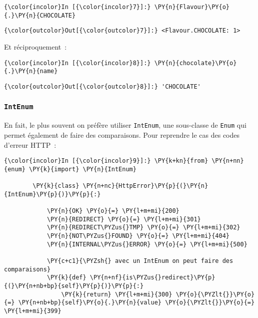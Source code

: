     \begin{Verbatim}[commandchars=\\\{\},frame=single,framerule=0.3mm,rulecolor=\color{cellframecolor}]
{\color{incolor}In [{\color{incolor}7}]:} \PY{n}{Flavour}\PY{o}{.}\PY{n}{CHOCOLATE}
\end{Verbatim}


\begin{Verbatim}[commandchars=\\\{\},frame=single,framerule=0.3mm,rulecolor=\color{cellframecolor}]
{\color{outcolor}Out[{\color{outcolor}7}]:} <Flavour.CHOCOLATE: 1>
\end{Verbatim}
            
    Et réciproquement~:

    \begin{Verbatim}[commandchars=\\\{\},frame=single,framerule=0.3mm,rulecolor=\color{cellframecolor}]
{\color{incolor}In [{\color{incolor}8}]:} \PY{n}{chocolate}\PY{o}{.}\PY{n}{name}
\end{Verbatim}


\begin{Verbatim}[commandchars=\\\{\},frame=single,framerule=0.3mm,rulecolor=\color{cellframecolor}]
{\color{outcolor}Out[{\color{outcolor}8}]:} 'CHOCOLATE'
\end{Verbatim}
            
    \hypertarget{intenum}{%
\subsubsection{\texorpdfstring{\texttt{IntEnum}}{IntEnum}}\label{intenum}}

    En fait, le plus souvent on préfère utiliser \texttt{IntEnum}, une
sous-classe de \texttt{Enum} qui permet également de faire des
comparaisons. Pour reprendre le cas des codes d'erreur HTTP~:

    \begin{Verbatim}[commandchars=\\\{\},frame=single,framerule=0.3mm,rulecolor=\color{cellframecolor}]
{\color{incolor}In [{\color{incolor}9}]:} \PY{k+kn}{from} \PY{n+nn}{enum} \PY{k}{import} \PY{n}{IntEnum}
        
        \PY{k}{class} \PY{n+nc}{HttpError}\PY{p}{(}\PY{n}{IntEnum}\PY{p}{)}\PY{p}{:}
        
            \PY{n}{OK} \PY{o}{=} \PY{l+m+mi}{200}
            \PY{n}{REDIRECT} \PY{o}{=} \PY{l+m+mi}{301}
            \PY{n}{REDIRECT\PYZus{}TMP} \PY{o}{=} \PY{l+m+mi}{302}
            \PY{n}{NOT\PYZus{}FOUND} \PY{o}{=} \PY{l+m+mi}{404}
            \PY{n}{INTERNAL\PYZus{}ERROR} \PY{o}{=} \PY{l+m+mi}{500}
        
            \PY{c+c1}{\PYZsh{} avec un IntEnum on peut faire des comparaisons}
            \PY{k}{def} \PY{n+nf}{is\PYZus{}redirect}\PY{p}{(}\PY{n+nb+bp}{self}\PY{p}{)}\PY{p}{:}
                \PY{k}{return} \PY{l+m+mi}{300} \PY{o}{\PYZlt{}}\PY{o}{=} \PY{n+nb+bp}{self}\PY{o}{.}\PY{n}{value} \PY{o}{\PYZlt{}}\PY{o}{=} \PY{l+m+mi}{399}
\end{Verbatim}


